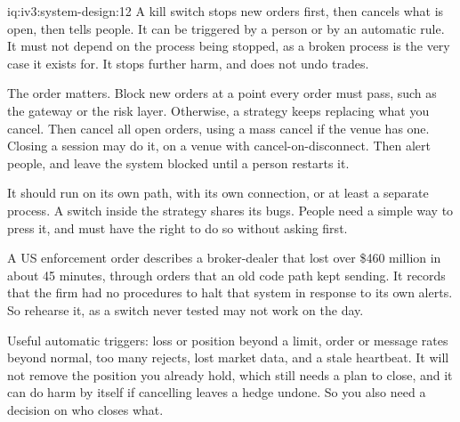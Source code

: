 \begin{solution}{iq:iv3:system-design:12}
A kill switch stops new orders first, then cancels what is open, then tells people. It can be triggered by a person or by an automatic rule. It must not depend on the process being stopped, as a broken process is the very case it exists for. It stops further harm, and does not undo trades.

The order matters. Block new orders at a point every order must pass, such as the gateway or the risk layer. Otherwise, a strategy keeps replacing what you cancel. Then cancel all open orders, using a mass cancel if the venue has one. Closing a session may do it, on a venue with cancel-on-disconnect. Then alert people, and leave the system blocked until a person restarts it.

It should run on its own path, with its own connection, or at least a separate process. A switch inside the strategy shares its bugs. People need a simple way to press it, and must have the right to do so without asking first.

A US enforcement order describes a broker-dealer that lost over \$460 million in about 45 minutes, through orders that an old code path kept sending. It records that the firm had no procedures to halt that system in response to its own alerts. So rehearse it, as a switch never tested may not work on the day.

Useful automatic triggers: loss or position beyond a limit, order or message rates beyond normal, too many rejects, lost market data, and a stale heartbeat. It will not remove the position you already hold, which still needs a plan to close, and it can do harm by itself if cancelling leaves a hedge undone. So you also need a decision on who closes what.

\end{solution}


